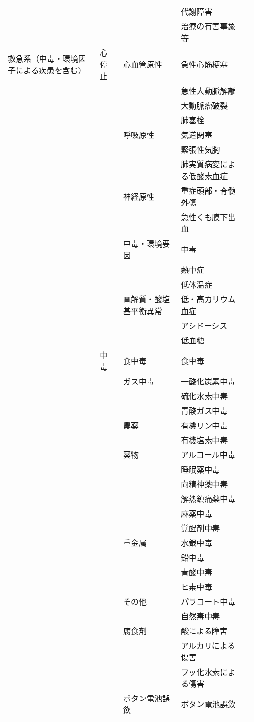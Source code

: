\begin{xltabular}{\linewidth}{XXXXX}
 &  &  & 代謝障害 &  \\
 &  &  & 治療の有害事象等 &  \\
救急系（中毒・環境因子による疾患を含む） & 心停止 & 心血管原性 & 急性心筋梗塞 &  \\
 &  &  & 急性大動脈解離 &  \\
 &  &  & 大動脈瘤破裂 &  \\
 &  &  & 肺塞栓 &  \\
 &  & 呼吸原性 & 気道閉塞 &  \\
 &  &  & 緊張性気胸 &  \\
 &  &  & 肺実質病変による低酸素血症 &  \\
 &  & 神経原性 & 重症頭部・脊髄外傷 &  \\
 &  &  & 急性くも膜下出血 &  \\
 &  & 中毒・環境要因 & 中毒 &  \\
 &  &  & 熱中症 &  \\
 &  &  & 低体温症 &  \\
 &  & 電解質・酸塩基平衡異常 & 低・高カリウム血症 &  \\
 &  &  & アシドーシス &  \\
 &  &  & 低血糖 &  \\
 & 中毒 & 食中毒 & 食中毒 &  \\
 &  & ガス中毒 & 一酸化炭素中毒 &  \\
 &  &  & 硫化水素中毒 &  \\
 &  &  & 青酸ガス中毒 &  \\
 &  & 農薬 & 有機リン中毒 &  \\
 &  &  & 有機塩素中毒 &  \\
 &  & 薬物 & アルコール中毒 &  \\
 &  &  & 睡眠薬中毒 &  \\
 &  &  & 向精神薬中毒 &  \\
 &  &  & 解熱鎮痛薬中毒 &  \\
 &  &  & 麻薬中毒 &  \\
 &  &  & 覚醒剤中毒 &  \\
 &  & 重金属 & 水銀中毒 &  \\
 &  &  & 鉛中毒 &  \\
 &  &  & 青酸中毒 &  \\
 &  &  & ヒ素中毒 &  \\
 &  & その他 & パラコート中毒 &  \\
 &  &  & 自然毒中毒 &  \\
 &  & 腐食剤 & 酸による障害 &  \\
 &  &  & アルカリによる傷害 &  \\
 &  &  & フッ化水素による傷害 &  \\
 &  & ボタン電池誤飲 & ボタン電池誤飲 &  \\
\bottomrule
\end{xltabular}



